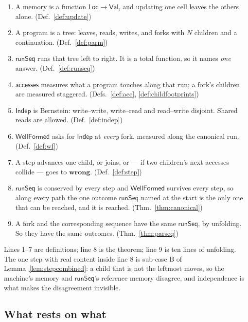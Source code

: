 \documentclass[11pt,a4paper]{article}
\theoremstyle{definition}
\theoremstyle{plain}
\theoremstyle{remark}
\newcommand{\Loc}{\mathsf{Loc}}
\newcommand{\Val}{\mathsf{Val}}
\newcommand{\acc}{\mathsf{accesses}}
\newcommand{\runSeq}{\mathsf{runSeq}}
\newcommand{\wf}{\mathsf{WellFormed}}
\newcommand{\Indep}{\mathsf{Indep}}
\newcommand{\wrong}{\mathbf{wrong}}
\begin{document}
\begin{enumerate}[label=\arabic*.,leftmargin=2.2em,itemsep=2pt]
\item A memory is a function $\Loc \to \Val$, and updating one cell leaves the others alone.
      \hfill (Def.~\ref{def:update})
\item A program is a tree: leaves, reads, writes, and forks with $N$ children and a
      continuation. \hfill (Def.~\ref{def:parm})
\item $\runSeq$ runs that tree left to right. It is a total function, so it names \emph{one}
      answer. \hfill (Def.~\ref{def:runseq})
\item $\acc$ measures what a program touches along that run; a fork's children are measured
      staggered. \hfill (Defs.~\ref{def:acc}, \ref{def:childfootprints})
\item $\Indep$ is Bernstein: write--write, write--read and read--write disjoint. Shared reads
      are allowed. \hfill (Def.~\ref{def:indep})
\item $\wf$ asks for $\Indep$ at \emph{every} fork, measured along the canonical run.
      \hfill (Def.~\ref{def:wf})
\item A step advances one child, or joins, or --- if two children's next accesses collide ---
      goes to $\wrong$. \hfill (Def.~\ref{def:step})
\item $\runSeq$ is conserved by every step and $\wf$ survives every step, so along every path
      the one outcome $\runSeq$ named at the start is the only one that can be reached, and it
      is reached. \hfill (Thm.~\ref{thm:canonical})
\item A fork and the corresponding sequence have the same $\runSeq$, by unfolding. So they have
      the same outcomes. \hfill (Thm.~\ref{thm:parseq})
\end{enumerate}

\noindent
Lines 1--7 are definitions; line 8 is the theorem; line 9 is ten lines of unfolding. The one
step with real content inside line 8 is sub-case B of Lemma~\ref{lem:stepcombined}: a child
that is not the leftmost moves, so the machine's memory and $\runSeq$'s reference memory
disagree, and independence is what makes the disagreement invisible.

\subsection{What rests on what}\label{sec:recap:deps}
\end{document}
